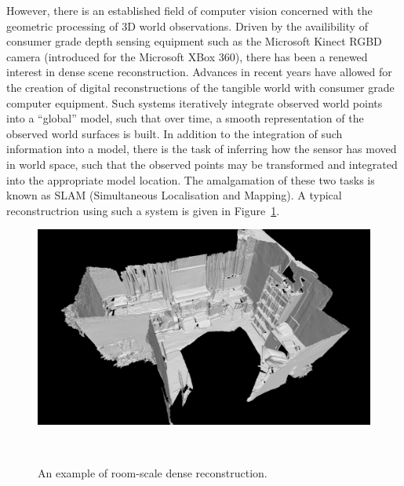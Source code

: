 However, there is an established field of computer vision concerned with the geometric processing 
of 3D world observations. Driven by the availibility of consumer grade depth sensing equipment such 
as the Microsoft Kinect RGBD camera (introduced for the Microsoft XBox 360), there has been a renewed 
interest in dense scene reconstruction. Advances in recent years have allowed for the creation of digital 
reconstructions of the tangible world with consumer grade computer equipment. Such systems iteratively 
integrate observed world points into a ``global'' model, such that over time, a smooth representation 
of the observed world surfaces is built. In addition to the integration of such information into a model, 
there is the task of inferring how the sensor has moved in world space, such that the observed points may 
be transformed and integrated into the appropriate model location. The amalgamation of these two tasks is 
known as SLAM (Simultaneous Localisation and Mapping). A typical reconstructrion using such a system is 
given in Figure~\ref{figure:room_recon_example}.
\begin{figure}[!htbp]
  \centering
  \includegraphics[width=.9\linewidth]{figures/intro/room_scene.png}
  \caption[Room Scale Dense Reconstruction]{An example of room-scale dense reconstruction.}
~\label{figure:room_recon_example}
\end{figure}

